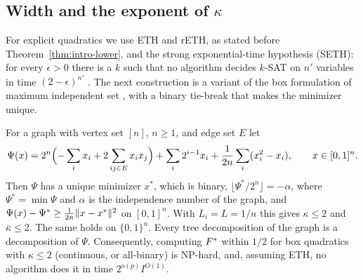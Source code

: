 \subsection{Width and the exponent of \texorpdfstring{$\kappa$}{kappa}}\label{sec:limits-width}

For explicit quadratics we use ETH and rETH, as stated before
Theorem~\ref{thm:intro-lower}, and the strong exponential-time hypothesis
(SETH): for every $\epsilon>0$ there is a $k$ such that no algorithm decides
$k$-SAT on $n'$ variables in time $(2-\epsilon)^{n'}$
\cite[Chapter~14]{CyganEtAl2015}. The next construction is a variant of the
box formulation of maximum independent set \cite{AbelloEtAl2001}, with a
binary tie-break that makes the minimizer unique.

\begin{proposition}
\label{prop:lbwidth}
For a graph with vertex set $[n]$, $n\ge1$, and edge set $E$ let
\[
\Psi(x)=2^n\Bigl(-\sum_ix_i+2\sum_{ij\in E}x_ix_j\Bigr)+\sum_i2^{i-1}x_i
+\frac1{2n}\sum_i(x_i^2-x_i),\qquad x\in[0,1]^n .
\]
Then $\Psi$ has a unique minimizer $x^*$, which is binary,
$\lfloor\Psi^*/2^n\rfloor=-\alpha$, where $\Psi^*=\min\Psi$ and $\alpha$ is
the independence number of the graph, and
$\Psi(x)-\Psi^*\ge\frac1{2n}\lVert x-x^*\rVert^2$ on $[0,1]^n$. With $L_i=L=1/n$
this gives $\kappa\le2$ and $\bar\kappa\le2$. The same holds on
$\{0,1\}^n$. Every tree decomposition of the graph is a decomposition of
$\Psi$. Consequently, computing $F^{*}$ within $1/2$ for box quadratics with
$\kappa\le2$ (continuous, or all-binary) is NP-hard, and, assuming ETH, no
algorithm does it in time $2^{o(p)}I^{O(1)}$.
\end{proposition}

